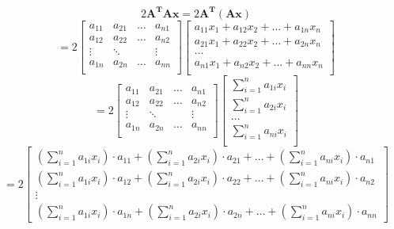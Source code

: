 \documentclass[12pt]{article}
\begin{document}
\begin{enumerate}
\begin{enumerate}
            $$2\pmb{A^TAx} = 2\pmb{A^T}(\pmb{Ax})$$
            $$= 2\begin{bmatrix}
                a_{11} & a_{21} & \dots & a_{n1} \\
                a_{12} & a_{22} & \dots & a_{n2} \\
                \vdots & \ddots &  & \vdots \\
                a_{1n} & a_{2n} & \dots & a_{nn} \\
            \end{bmatrix}
            \begin{bmatrix}
                a_{11}x_1 + a_{12}x_2 + \dots + a_{1n}x_n \\
                a_{21}x_1 + a_{22}x_2 + \dots + a_{2n}x_n \\
                \dots \\
                a_{n1}x_1 + a_{n2}x_2 + \dots + a_{nn}x_n \\
            \end{bmatrix} $$
            $$= 2\begin{bmatrix}
                a_{11} & a_{21} & \dots & a_{n1} \\
                a_{12} & a_{22} & \dots & a_{n2} \\
                \vdots & \ddots &  & \vdots \\
                a_{1n} & a_{2n} & \dots & a_{nn} \\
            \end{bmatrix}
            \begin{bmatrix}
                \sum_{i = 1}^n a_{1i}x_i \\
                \sum_{i = 1}^n a_{2i}x_i  \\
                \dots \\
                \sum_{i = 1}^n a_{ni}x_i \\
            \end{bmatrix} $$
            $$= 2\begin{bmatrix}
                (\sum_{i = 1}^n a_{1i}x_i)\cdot a_{11} + (\sum_{i = 1}^n a_{2i}x_i)\cdot a_{21} + \dots + (\sum_{i = 1}^n a_{ni}x_i)\cdot a_{n1} \\
                (\sum_{i = 1}^n a_{1i}x_i)\cdot a_{12} + (\sum_{i = 1}^n a_{2i}x_i)\cdot a_{22} + \dots + (\sum_{i = 1}^n a_{ni}x_i)\cdot a_{n2} \\
                \vdots \\
                (\sum_{i = 1}^n a_{1i}x_i)\cdot a_{1n} + (\sum_{i = 1}^n a_{2i}x_i)\cdot a_{2n} + \dots + (\sum_{i = 1}^n a_{ni}x_i)\cdot a_{nn}
            \end{bmatrix}$$


\end{enumerate}
\end{enumerate}
\end{document}
